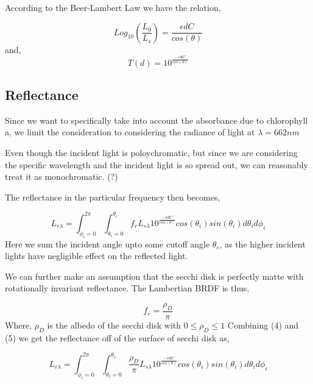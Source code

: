 \documentclass{article}
\begin{document}
According to the Beer-Lambert Law we have the relation,

\begin{equation}
  Log_{10}\left(\frac{L_0}{L_{s}}\right) = \frac{\epsilon d C}{cos(\theta)}
\end{equation}
and,
\begin{equation}
  T(d) = 10^\frac{-\epsilon d C}{cos(\theta)}
\end{equation}

\subsection{Reflectance}

Since we want to specifically take into account the
absorbance due to chlorophyll a, we limit the consideration
to considering the radiance of light at $\lambda = 662nm$

Even though the incident light is poloychromatic, but since we are considering the specific wavelength
and the incident light is so spread out, we can reasonably treat it as monochromatic. (?)

The reflectance in the particular frequency then becomes,

\begin{equation}
  L_{r \lambda} = \int^{2\pi}_{\phi_i = 0}\int^{\theta_c}_{\theta_i = 0}
  f_r L_{s\lambda} 10^\frac{-\epsilon d C}{cos(\theta)}cos(\theta_i)sin(\theta_i)d\theta_i d\phi_i
\end{equation}
Here we sum the incident angle upto some cutoff angle $\theta_c$, as the higher incident lights
have negligible effect on the reflected light.


We can further make an assumption that the secchi disk is perfectly matte with rotationally
invariant reflectance. The Lambertian BRDF is thus,

\begin{equation}
  f_r = \frac{\rho_D}{\pi}
\end{equation}
Where, $ \rho_D$ is the albedo of the secchi disk with $ 0 \leq \rho_D \leq 1$
Combining (4) and (5) we get the reflectance off of the surface of secchi disk as,

\begin{equation}
  L_{r \lambda} = \int^{2\pi}_{\phi_i = 0}\int^{\theta_c}_{\theta_i = 0}
  \frac{\rho_D}{\pi} L_{s\lambda} 10^\frac{-\epsilon d C}{cos(\theta)}cos(\theta_i)sin(\theta_i)d\theta_i d\phi_i
\end{equation}
\end{document}
